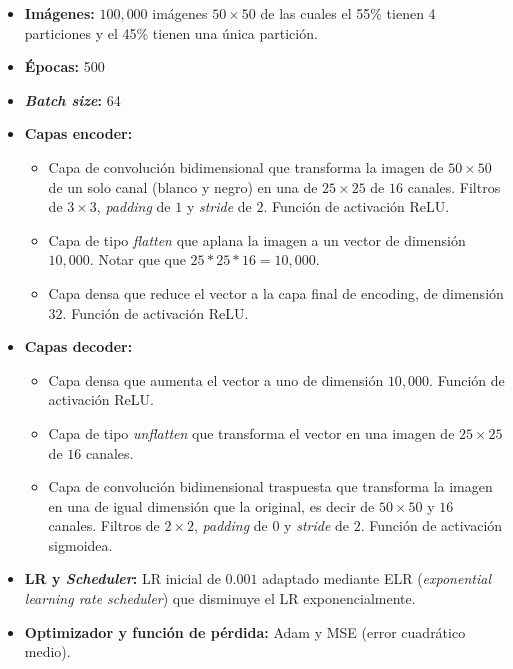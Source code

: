 \begin{itemize}
    \setlength{\itemsep}{0pt}
    \item[-] \textbf{Imágenes:} $100,000$ imágenes $50\times50$ de las cuales el 55\% tienen 4 particiones y el 45\% tienen una única partición.
    \item[-] \textbf{Épocas:} 500
    \item[-] \textbf{\emph{Batch size}:} 64
    \item[-] \textbf{Capas encoder:}
            \begin{itemize}
            \setlength{\itemsep}{0pt}
                \item Capa de convolución bidimensional que transforma la imagen de $50\times50$ de un solo canal (blanco y negro) en una de $25\times25$ de $16$ canales. Filtros de $3\times3$, \textit{padding} de $1$ y \textit{stride} de $2$. Función de activación ReLU.
                \item Capa de tipo \textit{flatten} que aplana la imagen a un vector de dimensión $10,000$. Notar que  que $25*25*16=10,000$.
                \item Capa densa que reduce el vector a la capa final de encoding, de dimensión $32$. Función de activación ReLU.
            \end{itemize}
    \item[-] \textbf{Capas decoder:}
            \begin{itemize}
            \setlength{\itemsep}{0pt}
                \item Capa densa que aumenta el vector a uno de dimensión $10,000$. Función de activación ReLU.
                \item Capa de tipo \textit{unflatten} que transforma el vector en una imagen de $25\times25$ de $16$ canales.
                \item Capa de convolución bidimensional traspuesta que transforma la imagen en una de igual dimensión que la original, es decir de $50\times50$ y $16$ canales. Filtros de $2\times2$, \textit{padding} de $0$ y \textit{stride} de $2$. Función de activación sigmoidea.
            \end{itemize}
    \item[-] \textbf{LR y \emph{Scheduler}:} LR inicial de $0.001$ adaptado mediante ELR (\emph{exponential learning rate scheduler}) que disminuye el LR exponencialmente.
    \item[-] \textbf{Optimizador y función de pérdida:} Adam y MSE (error cuadrático medio).
\end{itemize}

